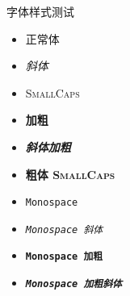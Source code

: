 \documentclass[12pt,aspectratio=169]{beamer}
\begin{document}
\begin{frame}{字体样式测试}
  \begin{itemize}
    \item 正常体
    \item \textit{斜体}
    \item \textsc{SmallCaps}
    \item \textbf{加粗}
    \item \textbf{\textit{斜体加粗}}
    \item \textbf{\textsc{粗体 SmallCaps}}
    \item \texttt{Monospace}
    \item \texttt{\textit{Monospace 斜体}}
    \item \texttt{\textbf{Monospace 加粗}}
    \item \texttt{\textbf{\textit{Monospace 加粗斜体}}}
  \end{itemize}
\end{frame}
\end{document}
